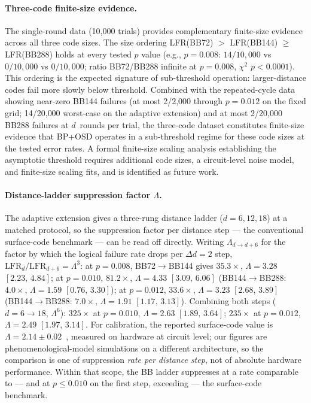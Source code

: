 \documentclass[11pt,a4paper]{article}
\begin{document}
\paragraph{Three-code finite-size evidence.}
The single-round data (10{,}000 trials) provides complementary
finite-size evidence across all three code sizes.
The size ordering LFR(BB72) $>$ LFR(BB144) $\ge$ LFR(BB288) holds
at every tested $p$ value
(e.g., $p=0.008$: $14/10{,}000$ vs $0/10{,}000$ vs $0/10{,}000$;
ratio BB72/BB288 infinite at $p=0.008$, $\chi^2$ $p<0.0001$).
This ordering is the expected signature of sub-threshold operation:
larger-distance codes fail more slowly below threshold.
Combined with the repeated-cycle data showing near-zero BB144 failures (at most 2/2{,}000
through $p=0.012$ on the fixed grid; 14/20{,}000 worst-case on the
adaptive extension) and at most 2/20{,}000 BB288 failures at $d$~rounds
per trial, the three-code dataset
constitutes finite-size evidence that BP+OSD operates in a sub-threshold
regime for these code sizes at the tested error rates.
A formal finite-size scaling analysis establishing the asymptotic threshold
requires additional code sizes, a circuit-level noise model, and
finite-size scaling fits, and is identified as future work.

\paragraph{Distance-ladder suppression factor $\Lambda$.}
The adaptive extension gives a three-rung distance ladder
($d=6,12,18$) at a matched protocol, so the suppression factor per
distance step --- the conventional surface-code benchmark --- can be
read off directly. Writing $\Lambda_{d\to d+6}$ for the factor by
which the logical failure rate drops per $\Delta d=2$ step,
$\mathrm{LFR}_d/\mathrm{LFR}_{d+6}=\Lambda^3$:
at $p=0.008$, BB72$\to$BB144 gives $35.3\times$,
$\Lambda=3.28$ $[2.23,\,4.84]$;
at $p=0.010$, $81.2\times$, $\Lambda=4.33$ $[3.09,\,6.06]$
(BB144$\to$BB288: $4.0\times$, $\Lambda=1.59$ $[0.76,\,3.30]$);
at $p=0.012$, $33.6\times$, $\Lambda=3.23$ $[2.68,\,3.89]$
(BB144$\to$BB288: $7.0\times$, $\Lambda=1.91$ $[1.17,\,3.13]$).
Combining both steps ($d=6\to18$, $\Lambda^6$): $325\times$ at
$p=0.010$, $\Lambda=2.63$ $[1.89,\,3.64]$; $235\times$ at $p=0.012$,
$\Lambda=2.49$ $[1.97,\,3.14]$.
For calibration, the reported surface-code value is
$\Lambda=2.14\pm0.02$~\cite{Acharya2024lambda}, measured on hardware
at circuit level; our figures are phenomenological-model simulations on
a different architecture, so the comparison is one of suppression
\emph{rate per distance step}, not of absolute hardware performance.
Within that scope, the BB ladder suppresses at a rate comparable to ---
and at $p\le0.010$ on the first step, exceeding --- the surface-code
benchmark.
\end{document}
